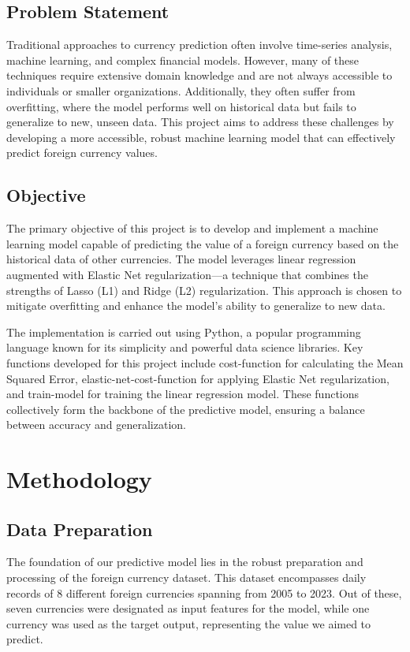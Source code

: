 \documentclass[conference]{IEEEtran}
\begin{document}
\subsection{Problem Statement}
Traditional approaches to currency prediction often involve time-series analysis, machine learning, and complex financial models. However, many of these techniques require extensive domain knowledge and are not always accessible to individuals or smaller organizations. Additionally, they often suffer from overfitting, where the model performs well on historical data but fails to generalize to new, unseen data. This project aims to address these challenges by developing a more accessible, robust machine learning model that can effectively predict foreign currency values.

\subsection{Objective}
The primary objective of this project is to develop and implement a machine learning model capable of predicting the value of a foreign currency based on the historical data of other currencies. The model leverages linear regression augmented with Elastic Net regularization—a technique that combines the strengths of Lasso (L1) and Ridge (L2) regularization. This approach is chosen to mitigate overfitting and enhance the model's ability to generalize to new data.

The implementation is carried out using Python, a popular programming language known for its simplicity and powerful data science libraries. Key functions developed for this project include cost-function for calculating the Mean Squared Error, elastic-net-cost-function for applying Elastic Net regularization, and train-model for training the linear regression model. These functions collectively form the backbone of the predictive model, ensuring a balance between accuracy and generalization.

\section{Methodology}
\subsection{Data Preparation}
The foundation of our predictive model lies in the robust preparation and processing of the foreign currency dataset. This dataset encompasses daily records of 8 different foreign currencies spanning from 2005 to 2023. Out of these, seven currencies were designated as input features for the model, while one currency was used as the target output, representing the value we aimed to predict.
\end{document}
